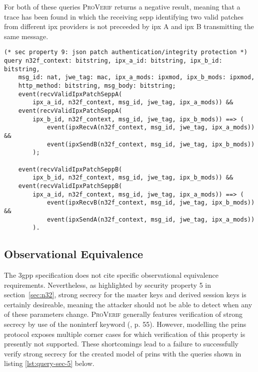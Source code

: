 For both of these queries \textsc{ProVerif} returns a negative result, meaning that a trace has been found in which the receiving \gls{sepp} identifying two valid patches from different \gls{ipx} providers is not preceeded by \gls{ipx} A and \gls{ipx} B transmitting the same message.

\begin{lstlisting}[caption={Query for security property 9},label={lst:query-sec-9},firstnumber=383]
(* sec property 9: json patch authentication/integrity protection *)
query n32f_context: bitstring, ipx_a_id: bitstring, ipx_b_id: bitstring,
    msg_id: nat, jwe_tag: mac, ipx_a_mods: ipxmod, ipx_b_mods: ipxmod,
    http_method: bitstring, msg_body: bitstring;
    event(recvValidIpxPatchSeppA(
        ipx_a_id, n32f_context, msg_id, jwe_tag, ipx_a_mods)) &&
    event(recvValidIpxPatchSeppA(
        ipx_b_id, n32f_context, msg_id, jwe_tag, ipx_b_mods)) ==> (
            event(ipxRecvA(n32f_context, msg_id, jwe_tag, ipx_a_mods)) &&
            event(ipxSendB(n32f_context, msg_id, jwe_tag, ipx_b_mods))
        );

    event(recvValidIpxPatchSeppB(
        ipx_b_id, n32f_context, msg_id, jwe_tag, ipx_b_mods)) &&
    event(recvValidIpxPatchSeppB(
        ipx_a_id, n32f_context, msg_id, jwe_tag, ipx_a_mods)) ==> (
            event(ipxRecvB(n32f_context, msg_id, jwe_tag, ipx_b_mods)) &&
            event(ipxSendA(n32f_context, msg_id, jwe_tag, ipx_a_mods))
        ).
\end{lstlisting}


\subsection{Observational Equivalence}
\label{ssec:equivalence}

The \gls{3gpp} specification does not cite specific observational equivalence requirements.
Nevertheless, as highlighted by security property 5 in section~\ref{sec:n32}, strong secrecy for the master keys and derived session keys is certainly desireable, meaning the attacker should not be able to detect when any of these parameters change.
\textsc{ProVerif} generally features verification of strong secrecy by use of the {\sffamily noninterf} keyword (\cite{blanchet2020proverif}, p. 55).
However, modelling the \gls{prins} protocol exposes multiple corner cases for which verification of this property is presently not supported.
These shortcomings lead to a failure to successfully verify strong secrecy for the created model of \gls{prins} with the queries shown in listing \ref{lst:query-sec-5} below.

